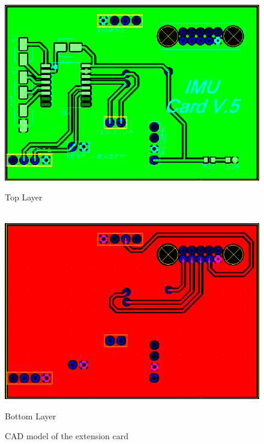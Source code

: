 \begin{figure}[!htbp]
\centering
    \includegraphics[scale=0.5]{IMUcoppertop}
        \caption{Top Layer}
        \label{fig:top}
    
    ~ %
        \includegraphics[scale=0.7]{IMUcopperbottom}
        \caption{Bottom Layer}
        \label{fig:bottom}
    \caption{CAD model of the extension card}\label{fig:CADmodel}
\end{figure}




